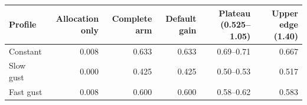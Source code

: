 \begin{tabular}{lrrrrr}
\toprule
Profile & Allocation only & Complete arm & Default gain & Plateau (0.525--1.05) & Upper edge (1.40) \\
\midrule
Constant & 0.008 & 0.633 & 0.633 & 0.69--0.71 & 0.667 \\
Slow gust & 0.000 & 0.425 & 0.425 & 0.50--0.53 & 0.517 \\
Fast gust & 0.008 & 0.600 & 0.600 & 0.58--0.62 & 0.583 \\
\bottomrule
\end{tabular}
